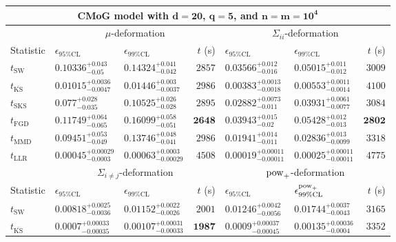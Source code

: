 \begin{tabular}{l|llr|llr}
	\toprule
	\multicolumn{7}{c}{{\bf CMoG model with $\mathbf{d=20}$, $\mathbf{q=5}$, and $\mathbf{n=m=10^{4}}$}} \\
	\toprule
	\multicolumn{1}{c}{} & \multicolumn{3}{c}{$\mu$-deformation} & \multicolumn{3}{c}{$\Sigma_{ii}$-deformation} \\
	Statistic & $\epsilon_{95\%\mathrm{CL}}$ & $\epsilon_{99\%\mathrm    {CL}}$ & $t$ (s) & $\epsilon_{95\%\mathrm{CL}}$ & $\epsilon_{99\%\mathrm{CL}}$ & $t$ (s) \\
	\midrule
	$t_{\mathrm{SW}}$ & $0.10336_{-0.05}^{+0.043}$ & $0.14324_{-0.042}^{+0.041}$ & $2857$ & $0.03566_{-0.016}^{+0.012}$ & $0.05015_{-0.012}^{+0.011}$ & $3009$ \\
	$t_{\overline{\mathrm{KS}}}$ & ${\mathbf{0.01015_{-0.0047}^{+0.0036}}}$ & ${\mathbf{0.01446_{-0.0037}^{+0.003}}}$ & $2986$ & ${\mathbf{0.00383_{-0.0018}^{+0.0013}}}$ & ${\mathbf{0.00553_{-0.0014}^{+0.0011}}}$ & $4100$ \\
	$t_{\mathrm{SKS}}$ & $0.077_{-0.035}^{+0.028}$ & $0.10525_{-0.028}^{+0.026}$ & $2895$ & $0.02882_{-0.011}^{+0.0073}$ & $0.03931_{-0.0077}^{+0.0061}$ & $3084$ \\
	$t_{\mathrm{FGD}}$ & $0.11749_{-0.065}^{+0.064}$ & $0.16099_{-0.051}^{+0.058}$ & ${\mathbf{2648}}$ & $0.03943_{-0.02}^{+0.015}$ & $0.05428_{-0.013}^{+0.012}$ & ${\mathbf{2802}}$ \\
	$t_{\mathrm{MMD}}$ & $0.09451_{-0.049}^{+0.053}$ & $0.13746_{-0.041}^{+0.048}$ & $2986$ & $0.01941_{-0.011}^{+0.014}$ & $0.02836_{-0.0099}^{+0.013}$ & $3318$ \\
	$t_{\mathrm{LLR}}$ & $0.00045_{-0.0003}^{+0.00029}$ & $0.00063_{-0.00029}^{+0.0003}$ & $4508$ & $0.00019_{-0.00011}^{+0.00011}$ & $0.00025_{-0.00011}^{+0.00011}$ & $4775$ \\
	\toprule
	\multicolumn{1}{c}{} & \multicolumn{3}{c}{$\Sigma_{i\neq j}$-deformation} & \multicolumn{3}{c}{$\rm{pow}_{+}$-deformation} \\
	Statistic & $\epsilon_{95\%\mathrm{CL}}$ & $\epsilon_{99\%\mathrm{CL}}$ & $t$ (s) & $\epsilon_{95\%\mathrm{CL}}$ & $\epsilon^{\rm   {pow}_{+}}_{99\%\mathrm{CL}}$ & $t$ (s) \\
	\midrule
	$t_{\mathrm{SW}}$ & $0.00818_{-0.0036}^{+0.0025}$ & $0.01152_{-0.0026}^{+0.0022}$ & $2001$ & $0.01246_{-0.0056}^{+0.0042}$ & $0.01744_{-0.0043}^{+0.0037}$ & $3165$ \\
	$t_{\overline{\mathrm{KS}}}$ & ${\mathbf{0.0007_{-0.00035}^{+0.00033}}}$ & ${\mathbf{0.00107_{-0.00033}^{+0.00031}}}$ & ${\mathbf{1987}}$ & ${\mathbf{0.0009_{-0.00045}^{+0.00037}}}$ & ${\mathbf{0.00135_{-0.0004}^{+0.00036}}}$ & $3352$ \\

\end{tabular}
